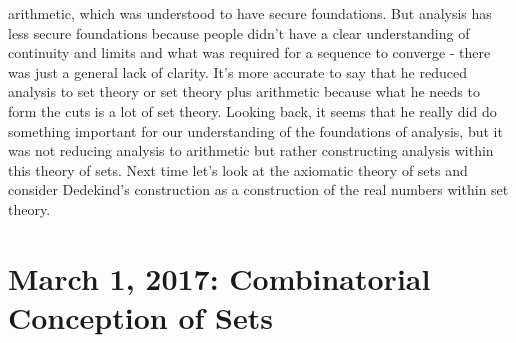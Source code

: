\documentclass[12pt]{article}
\theoremstyle{definition}
\begin{document}
\begin{enumerate}
        arithmetic, which was understood to have secure foundations. But
        analysis has less secure foundations because people didn't have a clear
        understanding of continuity and limits and what was required for a
        sequence to converge - there was just a general lack of clarity. It's
        more accurate to say that he reduced analysis to set theory or set
        theory plus arithmetic because what he needs to form the cuts is a lot
        of set theory. Looking back, it seems that he really did do something
        important for our understanding of the foundations of analysis, but it
        was not reducing analysis to arithmetic but rather constructing
        analysis within this theory of sets. Next time let's look at the
        axiomatic theory of sets and consider Dedekind's construction as a
        construction of the real numbers within set theory.

\end{enumerate}

\section{March 1, 2017: Combinatorial Conception of Sets}
\end{document}

